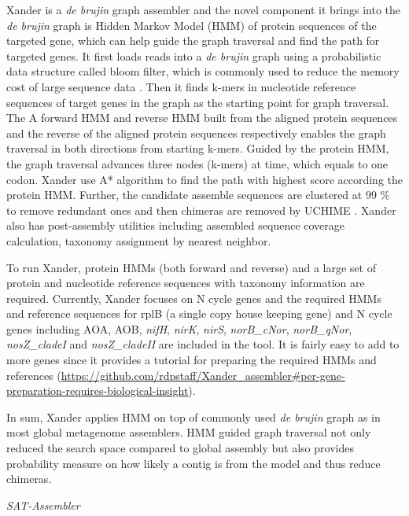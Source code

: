 \documentclass[]{msu-thesis}
\begin{document}
Xander is a \textit{de brujin} graph assembler and the novel component it brings into the \textit{de brujin} graph is Hidden Markov Model (HMM) of protein sequences of the targeted gene, which can help guide the graph traversal and find the path for targeted genes. It first loads reads into a \textit{de brujin} graph using a probabilistic data structure called bloom filter, which is commonly used to reduce the memory cost of large sequence data \cite{pell_scaling_2012}. Then it finds k-mers in nucleotide reference sequences of target genes in the graph as the starting point for graph traversal. The A forward HMM and reverse HMM built from the aligned protein sequences and the reverse of the aligned protein sequences respectively enables the graph traversal in both directions from starting k-mers. Guided by the protein HMM, the graph traversal advances three nodes (k-mers) at time, which equals to one codon. Xander use A* algorithm to find the path with highest score according the protein HMM. Further, the candidate assemble sequences are clustered at 99 \% to remove redundant ones and then chimeras are removed by UCHIME \cite{edgar_uchime_2011}. Xander also has post-assembly utilities including assembled sequence coverage calculation, taxonomy assignment by nearest neighbor.

To run Xander, protein HMMs (both forward and reverse) and a large set of protein and nucleotide reference sequences with taxonomy information are required. Currently, Xander focuses on N cycle genes and the required HMMs and reference sequences for rplB (a single copy house keeping gene) and  N cycle genes including AOA, AOB, \textit{nifH}, \textit{nirK}, \textit{nirS}, \textit{norB\_cNor}, \textit{norB\_qNor}, \textit{nosZ\_cladeI} and \textit{nosZ\_cladeII} are included in the tool. It is fairly easy to add to more genes since it provides a tutorial for preparing the required HMMs and references (\url{https://github.com/rdpstaff/Xander\_assembler\#per-gene-preparation-requires-biological-insight}).

In sum, Xander applies HMM on top of commonly used \textit{de brujin} graph as in most global metagenome assemblers. HMM guided graph traversal not only reduced the search space compared to global assembly but also provides probability measure on how likely a contig is from the model and thus reduce chimeras.

\textit{SAT-Assembler}
\end{document}
